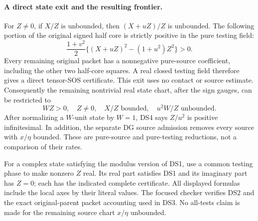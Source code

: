 \paragraph{A direct state exit and the resulting frontier.}
For $Z\ne0$, if $X/Z$ is unbounded, then
$(X+uZ)/Z$ is unbounded. The following portion of the original signed
half core is strictly positive in the pure testing field:
\[
 \frac{1+v^2}{2}\big\{(X+uZ)^2-(1+u^2)Z^2\big\}>0.
                                                               \tag{DS3}
\]
Every remaining original packet has a nonnegative pure-source
coefficient, including the other two half-core squares. A real
closed testing field therefore gives a direct tensor-SOS certificate.
This exit uses no contact or source estimate. Consequently the
remaining nontrivial real state chart, after the sign gauges, can be
restricted to
\[
 WZ>0,\quad Z\ne0,\quad X/Z\text{ bounded},\quad
                              u^2W/Z\text{ unbounded}.         \tag{DS4}
\]
After normalizing a $W$-unit state by $W=1$, DS4 says
$Z/u^2$ is positive infinitesimal. In addition, the separate DG
source admission removes every source with $x/\eta$ bounded. These
are pure-source and pure-testing reductions, not a comparison of
their rates.

For a complex state satisfying the modulus version of DS1, use a
common testing phase to make nonzero $Z$ real. Its real part satisfies
DS1 and its imaginary part has $Z=0$; each has the indicated complete
certificate. All displayed formulas include the local axes by their
literal values. The focused checker verifies DS2 and the exact
original-parent packet accounting used in DS3. No all-tests claim is
made for the remaining source chart $x/\eta$ unbounded.

